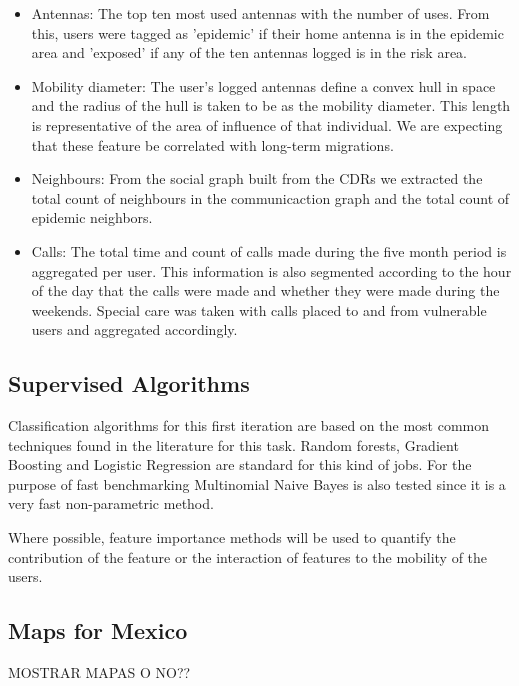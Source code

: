\begin{itemize}
    \item Antennas: The top ten most used antennas with the number of uses. From this, users were tagged as 'epidemic' if their home antenna is in the epidemic area and 'exposed' if any of the ten antennas logged is in the risk area.
    \item Mobility diameter: The user's logged antennas define a convex hull in space and the radius of the hull is taken to be as the mobility diameter. This length is representative of the area of influence of that individual. We are expecting that these feature be correlated with long-term migrations.
    \item Neighbours: From the social graph built from the CDRs we extracted the total count of neighbours in the communicaction graph and the total count of epidemic neighbors. 
    \item Calls: The total time and count of calls made during the five month period is aggregated per user. This information is also segmented according to the hour of the day that the calls were made and whether they were made during the weekends. Special care was taken with calls placed to and from vulnerable users and aggregated accordingly.
\end{itemize}


\subsection{Supervised Algorithms}

Classification algorithms for this first iteration are based on the most common techniques found in the literature for this task. Random forests, Gradient Boosting and Logistic Regression are standard for this kind of jobs. For the purpose of fast benchmarking Multinomial Naive Bayes is also tested since it is a very fast non-parametric method. 

Where possible, feature importance methods will be used to quantify the contribution of the feature or the interaction of features to the mobility of the users.

\subsection{Maps for Mexico}
MOSTRAR MAPAS O NO??